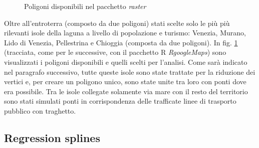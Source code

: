 \documentclass[a4paper,11pt,twoside,openright]{book}							%
\begin{document}
\begin{figure}[t]
	\centering
	\caption{Poligoni disponibili nel pacchetto \textit{raster}}
	\label{fig:Ven_poligoni}
\end{figure}

Oltre all'entroterra (composto da due poligoni) stati scelte solo le più più rilevanti isole della laguna a livello di popolazione e turismo: Venezia, Murano, Lido di Venezia, Pellestrina e Chioggia (composta da due poligoni). In fig. \ref{fig:Ven_poligoni} (tracciata, come per le successive, con il pacchetto R \textit{RgoogleMaps}) sono visualizzati i poligoni disponibili e quelli scelti per l'analisi. Come sarà indicato nel paragrafo successivo, tutte queste isole sono state trattate per la riduzione dei vertici e, per creare un poligono unico, sono state unite tra loro con ponti dove era possibile. Tra le isole collegate solamente via mare con il resto del territorio sono stati simulati ponti in corrispondenza delle trafficate linee di trasporto pubblico con traghetto. 

\subsection{Regression splines}
\end{document}
